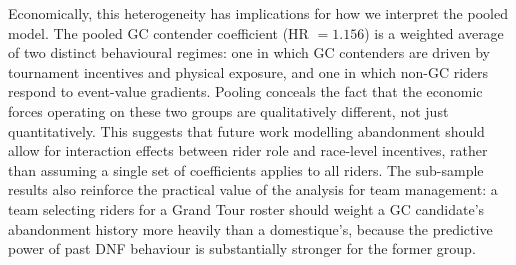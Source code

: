 Economically, this heterogeneity has implications for how we interpret the pooled model. The pooled GC contender coefficient (HR $= 1.156$) is a weighted average of two distinct behavioural regimes: one in which GC contenders are driven by tournament incentives and physical exposure, and one in which non-GC riders respond to event-value gradients. Pooling conceals the fact that the economic forces operating on these two groups are qualitatively different, not just quantitatively. This suggests that future work modelling abandonment should allow for interaction effects between rider role and race-level incentives, rather than assuming a single set of coefficients applies to all riders. The sub-sample results also reinforce the practical value of the analysis for team management: a team selecting riders for a Grand Tour roster should weight a GC candidate's abandonment history more heavily than a domestique's, because the predictive power of past DNF behaviour is substantially stronger for the former group.

